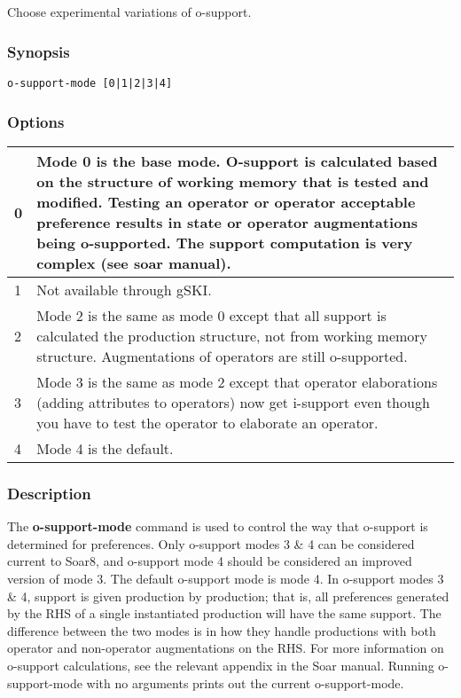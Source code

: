 \subsection{}
\label{o-support-mode}
Choose experimental variations of o-support. 
\subsubsection*{Synopsis}
\begin{verbatim}
o-support-mode [0|1|2|3|4]
\end{verbatim}
\subsubsection*{Options}
\begin{tabular}{|l|l|}
\hline 
 0  & Mode 0 is the base mode. O-support is calculated based on the structure of working memory that is tested and modified. Testing an operator or operator acceptable preference results in state or operator augmentations being o-supported. The support computation is very complex (see soar manual).  \\
 \hline 
 1  & Not available through gSKI.  \\
 \hline 
 2  & Mode 2 is the same as mode 0 except that all support is calculated the production structure, not from working memory structure. Augmentations of operators are still o-supported.  \\
 \hline 
 3  & Mode 3 is the same as mode 2 except that operator elaborations (adding attributes to operators) now get i-support even though you have to test the operator to elaborate an operator.  \\
 \hline 
 4  & Mode 4 is the default.  \\
 \hline 
\end{tabular}
\subsubsection*{Description}
 The \textbf{o-support-mode}
 command is used to control the way that o-support is determined for preferences. Only o-support modes 3 \& 4 can be considered current to Soar8, and o-support mode 4 should be considered an improved version of mode 3. The default o-support mode is mode 4. 
 In o-support modes 3 \& 4, support is given production by production; that is, all preferences generated by the RHS of a single instantiated production will have the same support. The difference between the two modes is in how they handle productions with both operator and non-operator augmentations on the RHS. For more information on o-support calculations, see the relevant appendix in the Soar manual. 
 Running o-support-mode with no arguments prints out the current o-support-mode. 
